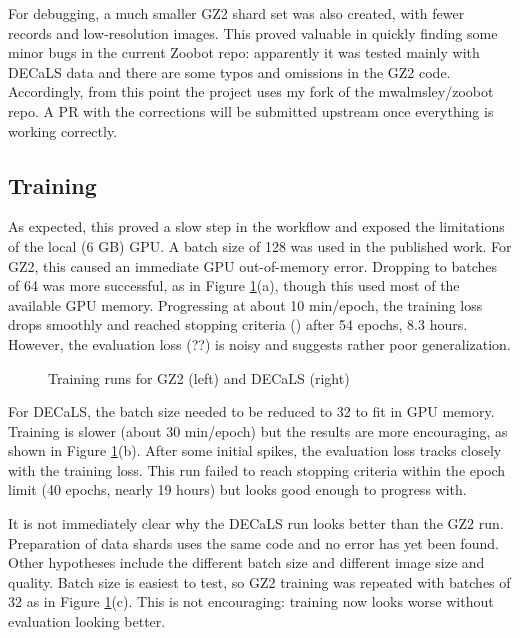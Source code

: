 \documentclass[preprint]{aastex63}
\newcommand{\todo}{\color{red}{TODO}\color{black}\hspace{2mm}}
\begin{document}
For debugging, a much smaller GZ2 shard set was also created, with fewer records and low-resolution images. This proved valuable in quickly finding some minor bugs in the current Zoobot repo: apparently it was tested mainly with DECaLS data and there are some typos and omissions in the GZ2 code. Accordingly, from this point the project uses my fork of the mwalmsley/zoobot repo. A PR with the corrections will be submitted upstream once everything is working correctly.

\subsection{Training}

As expected, this proved a slow step in the workflow and exposed the limitations of the local (6 GB) GPU. A batch size of 128 was used in the published work. For GZ2, this caused an immediate GPU out-of-memory error. Dropping to batches of 64 was more successful, as in Figure \ref{fig:train_plots}(a), though this used most of the available GPU memory. Progressing at about 10 min/epoch, the training loss drops smoothly and reached stopping criteria (\todo) after 54 epochs, 8.3 hours. However, the evaluation loss (??) is noisy and suggests rather poor generalization.


\begin{figure}
	\caption{Training runs for GZ2 (left) and DECaLS (right) \label{fig:train_plots}}
\end{figure}


For DECaLS, the batch size needed to be reduced to 32 to fit in GPU memory. Training is slower (about 30 min/epoch) but the results are more encouraging, as shown in Figure \ref{fig:train_plots}(b). After some initial spikes, the evaluation loss tracks closely with the training loss. This run failed to reach stopping criteria within the epoch limit (40 epochs, nearly 19 hours) but looks good enough to progress with.

It is not immediately clear why the DECaLS run looks better than the GZ2 run. Preparation of data shards uses the same code and no error has yet been found. Other hypotheses include the different batch size and different image size and quality. Batch size is easiest to test, so GZ2 training was repeated with batches of 32 as in Figure \ref{fig:train_plots}(c). This is not encouraging: training now looks worse without evaluation looking better.
\end{document}
